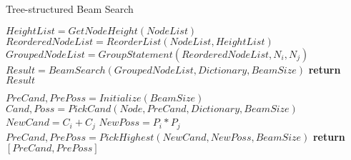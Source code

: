 \begin{algorithm}[t]
	\caption{Tree-structured Beam Search}
	\label{algo}
	\scriptsize
	\begin{algorithmic}[1]
		\State $HeightList = GetNodeHeight(NodeList)$ 
		\State $ReorderedNodeList = ReorderList(NodeList, HeightList)$ %
			\State $GroupedNodeList = GroupStatement(ReorderedNodeList, N_i, N_j)$ %
		\EndIf
		\State $Result = BeamSearch(GroupedNodeList, Dictionary, BeamSize)$
		\State \textbf{return} $Result$
		\EndFunction
		
		
		
		\State $PreCand, PrePoss = Initialize(BeamSize)$ %
			\State $Cand, Poss = PickCand(Node, PreCand, Dictionary, BeamSize)$ %
				\State $NewCand = C_i + C_j$
				\State $NewPoss = P_i * P_j$ %
				\State $PreCand, PrePoss = PickHighest(NewCand, NewPoss, BeamSize)$ %
			\EndFor
		\EndFor
		\State \textbf{return} $[PreCand, PrePoss]$ %
		\EndFunction 
		
	\end{algorithmic}
\end{algorithm}
